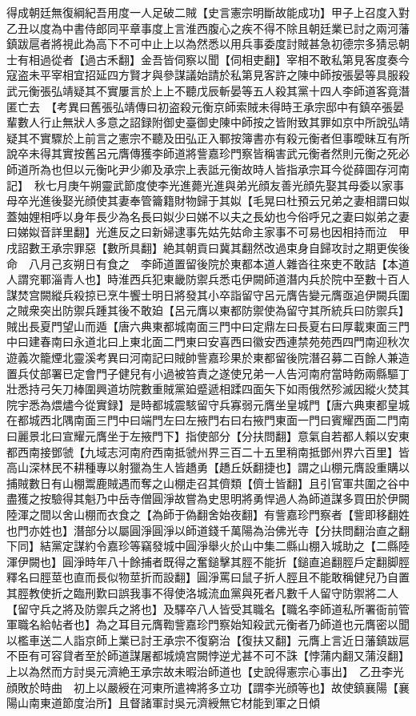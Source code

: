 得成朝廷無復綱紀吾用度一人足破二賊【史言憲宗明斷故能成功】甲子上召度入對乙丑以度為中書侍郎同平章事度上言淮西腹心之疾不得不除且朝廷業已討之兩河藩鎮跋扈者將視此為高下不可中止上以為然悉以用兵事委度討賊甚急初德宗多猜忌朝士有相過從者【過古禾翻】金吾皆伺察以聞【伺相吏翻】宰相不敢私第見客度奏今寇盗未平宰相宜招延四方賢才與參謀議始請於私第見客許之陳中師按張晏等具服殺武元衡張弘靖疑其不實屢言於上上不聽戊辰斬晏等五人殺其黨十四人李師道客竟潛匿亡去　【考異曰舊張弘靖傳曰初盗殺元衡京師索賊未得時王承宗邸中有鎮卒張晏輩數人行止無狀人多意之詔録附御史臺御史陳中師按之皆附致其罪如京中所說弘靖疑其不實驟於上前言之憲宗不聽及田弘正入鄆按簿書亦有殺元衡者但事曖昧互有所說卒未得其實按舊呂元膺傳獲李師道將訾嘉珍門察皆稱害武元衡者然則元衡之死必師道所為也但以元衡叱尹少卿及承宗上表詆元衡故時人皆指承宗耳今從薛圖存河南記】　秋七月庚午朔靈武節度使李光進薨光進與弟光顔友善光顔先娶其母委以家事母卒光進後娶光顔使其妻奉管籥籍財物歸于其姒【毛晃曰杜預云兄弟之妻相謂曰姒蓋妯娌相呼以身年長少為名長曰姒少曰娣不以夫之長幼也今俗呼兄之妻曰姒弟之妻曰娣姒音詳里翻】光進反之曰新婦逮事先姑先姑命主家事不可易也因相持而泣　甲戌詔數王承宗罪惡【數所具翻】絶其朝貢曰冀其翻然改過束身自歸攻討之期更俟後命　八月己亥朔日有食之　李師道置留後院於東都本道人雜沓往來吏不敢詰【本道人謂兖鄆淄青人也】時淮西兵犯東畿防禦兵悉屯伊闕師道潛内兵於院中至數十百人謀焚宫闕縱兵殺掠已烹牛饗士明日將發其小卒詣留守呂元膺告變元膺亟追伊闕兵圍之賊衆突出防禦兵踵其後不敢廹【呂元膺以東都防禦使為留守其所統兵曰防禦兵】賊出長夏門望山而遁【唐六典東都城南面三門中曰定鼎左曰長夏右曰厚載東面三門中曰建春南曰永道北曰上東北面二門東曰安喜西曰徽安西連禁苑苑西四門南迎秋次遊義次籠煙北靈溪考異曰河南記曰賊帥訾嘉珍果於東都留後院潛召募二百餘人兼造置兵仗部署已定會門子健兒有小過被笞責之遂使兄弟一人告河南府當時飭兩縣驅丁壯悉持弓矢刀棒圍興道坊院數重賊黨廹蹙遞相蹂四面矢下如雨俄然殄滅因縱火焚其院宇悉為煨燼今從實録】是時都城震駭留守兵寡弱元膺坐皇城門【唐六典東都皇城在都城西北隅南面三門中曰端門左曰左掖門右曰右掖門東面一門曰賓耀西面二門南曰麗景北曰宣耀元膺坐于左掖門下】指使部分【分扶問翻】意氣自若都人賴以安東都西南接鄧虢【九域志河南府西南抵虢州界三百二十五里稍南抵鄧州界六百里】皆高山深林民不耕種專以射獵為生人皆趫勇【趫丘妖翻捷也】謂之山棚元膺設重購以捕賊數日有山棚鬻鹿賊遇而奪之山棚走召其儕類【儕士皆翻】且引官軍共圍之谷中盡獲之按驗得其魁乃中岳寺僧圓淨故嘗為史思明將勇悍過人為師道謀多買田於伊闕陸渾之間以舍山棚而衣食之【為師于偽翻舍始夜翻】有訾嘉珍門察者【訾即移翻姓也門亦姓也】潛部分以屬圓淨圓淨以師道錢千萬陽為治佛光寺【分扶問翻治直之翻下同】結黨定謀約令嘉珍等竊發城中圓淨舉火於山中集二縣山棚入城助之【二縣陸渾伊闕也】圓淨時年八十餘捕者既得之奮鎚擊其脛不能折【鎚直追翻脛戶定翻脚脛釋名曰脛莖也直而長似物莖折而設翻】圓淨罵曰鼠子折人脛且不能敢稱健兒乃自置其脛教使折之臨刑歎曰誤我事不得使洛城流血黨與死者凡數千人留守防禦將二人【留守兵之將及防禦兵之將也】及驛卒八人皆受其職名【職名李師道私所署衙前管軍職名給帖者也】為之耳目元膺鞫訾嘉珍門察始知殺武元衡者乃師道也元膺密以聞以檻車送二人詣京師上業已討王承宗不復窮治【復扶又翻】元膺上言近日藩鎮跋扈不臣有可容貸者至於師道謀屠都城燒宫闕悖逆尤甚不可不誅【悖蒲内翻又蒲沒翻】上以為然而方討吳元濟絶王承宗故未暇治師道也【史說得憲宗心事出】　乙丑李光顔敗於時曲　初上以嚴綬在河東所遣禆將多立功【謂李光顔等也】故使鎮襄陽【襄陽山南東道節度治所】且督諸軍討吳元濟綬無它材能到軍之日傾